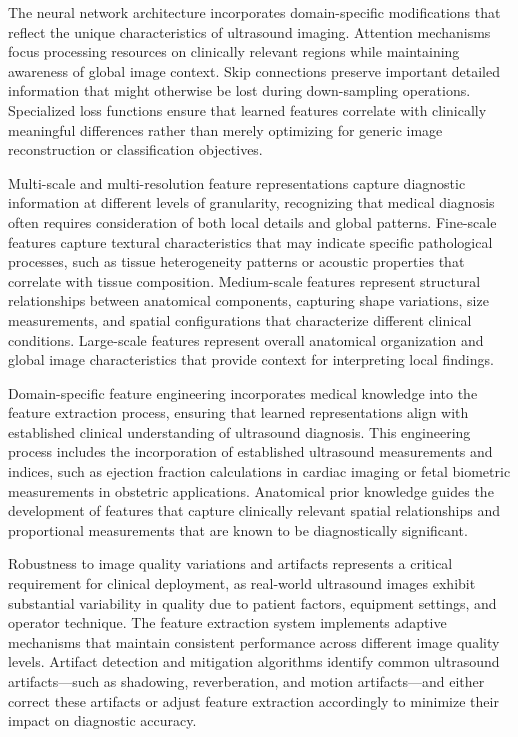 The neural network architecture incorporates domain-specific modifications that reflect the unique characteristics of ultrasound imaging. Attention mechanisms focus processing resources on clinically relevant regions while maintaining awareness of global image context. Skip connections preserve important detailed information that might otherwise be lost during down-sampling operations. Specialized loss functions ensure that learned features correlate with clinically meaningful differences rather than merely optimizing for generic image reconstruction or classification objectives.

Multi-scale and multi-resolution feature representations capture diagnostic information at different levels of granularity, recognizing that medical diagnosis often requires consideration of both local details and global patterns. Fine-scale features capture textural characteristics that may indicate specific pathological processes, such as tissue heterogeneity patterns or acoustic properties that correlate with tissue composition. Medium-scale features represent structural relationships between anatomical components, capturing shape variations, size measurements, and spatial configurations that characterize different clinical conditions. Large-scale features represent overall anatomical organization and global image characteristics that provide context for interpreting local findings.

Domain-specific feature engineering incorporates medical knowledge into the feature extraction process, ensuring that learned representations align with established clinical understanding of ultrasound diagnosis. This engineering process includes the incorporation of established ultrasound measurements and indices, such as ejection fraction calculations in cardiac imaging or fetal biometric measurements in obstetric applications. Anatomical prior knowledge guides the development of features that capture clinically relevant spatial relationships and proportional measurements that are known to be diagnostically significant.

Robustness to image quality variations and artifacts represents a critical requirement for clinical deployment, as real-world ultrasound images exhibit substantial variability in quality due to patient factors, equipment settings, and operator technique. The feature extraction system implements adaptive mechanisms that maintain consistent performance across different image quality levels. Artifact detection and mitigation algorithms identify common ultrasound artifacts—such as shadowing, reverberation, and motion artifacts—and either correct these artifacts or adjust feature extraction accordingly to minimize their impact on diagnostic accuracy.

